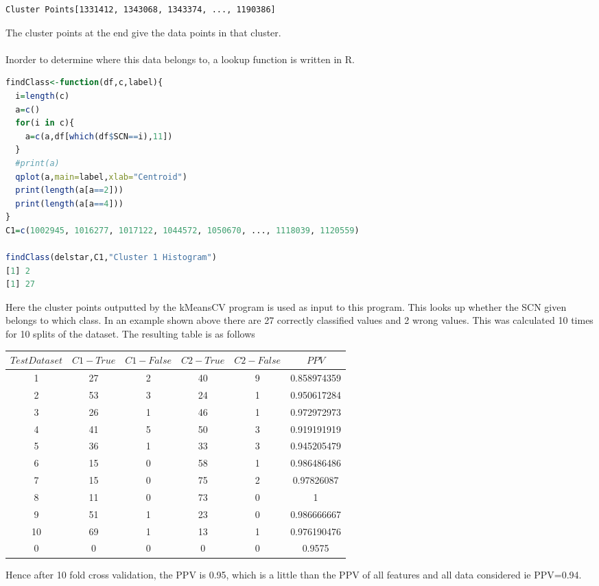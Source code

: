 \documentclass{article}
\begin{document}
\begin{enumerate}
\begin{verbatim}
Cluster Points[1331412, 1343068, 1343374, ..., 1190386]

\end{verbatim}
The cluster points at the end give the data points in that cluster.\\ \\
Inorder to determine where this data belongs to, a lookup function is written in R.
\begin{lstlisting}[language=R]
findClass<-function(df,c,label){
  i=length(c)
  a=c()
  for(i in c){
    a=c(a,df[which(df$SCN==i),11])
  }
  #print(a)
  qplot(a,main=label,xlab="Centroid")
  print(length(a[a==2]))
  print(length(a[a==4]))
}
C1=c(1002945, 1016277, 1017122, 1044572, 1050670, ..., 1118039, 1120559)

findClass(delstar,C1,"Cluster 1 Histogram")
[1] 2
[1] 27
\end{lstlisting}
Here the cluster points outputted by the kMeansCV program is used as input to this program. This looks up whether the SCN given belongs to which class. In an example shown above there are 27 correctly classified values and 2 wrong values. This was calculated 10 times for 10 splits of the dataset. The resulting table is as follows

\begin{center}
\begin{tabular}{|c|c|c|c|c|c|} \hline
$Test Dataset$ & $C1-True$ & $C1-False$ &$C2-True$&$C2-False$& $PPV$ \\ \hline \hline 
 1	& 27	& 2	& 40	& 9	& 0.858974359\\
 2	& 53	& 3	& 24	& 1	& 0.950617284\\
 3	& 26	& 1	& 46	& 1	& 0.972972973\\
 4	& 41	& 5	& 50	& 3 	& 0.919191919\\
 5	& 36	& 1	& 33	& 3 	& 0.945205479\\
 6	& 15	& 0	& 58	& 1	& 0.986486486\\
 7	& 15	& 0 	&75	& 2	& 0.97826087\\
 8	& 11	& 0	& 73	& 0	& 1\\
 9	& 51	& 1	& 23	& 0	& 0.986666667\\
 10 &69	& 1	& 13	& 1	& 0.976190476\\ \hline
 0	& 0 	& 0 & 0	& 0	&0.9575\\ \hline \hline
\end{tabular}
\end{center}
Hence after 10 fold cross validation, the PPV is 0.95, which is a little than the PPV of all features and all data considered ie PPV=0.94.
\end{enumerate}
\end{document}
